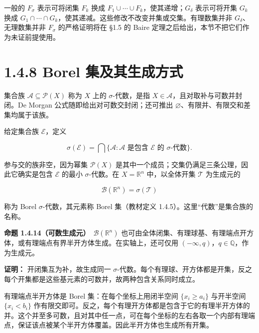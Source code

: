 \documentclass[11pt,a4paper]{article}
\begin{document}
一般的 \(F_\sigma\) 表示可将闭集 \(F_k\) 换成
\(F_1\cup\cdots\cup F_k\)，使其递增；\(G_\delta\) 表示可将开集 \(G_k\)
换成
\(G_1\cap\cdots\cap G_k\)，使其递减。这些修改不改变并集或交集。有理数集并非
\(G_\delta\)、无理数集并非 \(F_\sigma\) 的严格证明将在 §1.5 的 Baire
定理之后给出，本节不把它们作为未证前提使用。

\section[\S{}1.4.8 Borel
集及其生成方式]{1.4.8 Borel
集及其生成方式}\label{borel-ux96c6ux53caux5176ux751fux6210ux65b9ux5f0f}

集合族 \(\mathcal A\subseteq\mathcal P(X)\) 称为 \(X\) 上的
\(\sigma\)-代数，是指 \(X\in\mathcal A\)，且对取补与可数并封闭。De
Morgan 公式随即给出对可数交封闭；还可推出
\(\varnothing\)、有限并、有限交和差集均属于该族。

给定集合族 \(\mathcal E\)，定义

\begin{equation*}
\sigma(\mathcal E)=\bigcap\{\mathcal A:\mathcal A\text{ 是包含 }\mathcal E\text{ 的 }\sigma\text{-代数} \}.
\tag{1.4.15}
\end{equation*}

参与交的族非空，因为幂集 \(\mathcal P(X)\)
是其中一个成员；交集仍满足三条公理，因此它确实是包含 \(\mathcal E\)
的最小 \(\sigma\)-代数。在 \(X=\mathbb R^n\) 中，以全体开集
\(\mathcal T\) 为生成元的

\begin{equation*}
\mathcal B(\mathbb R^n)=\sigma(\mathcal T)
\tag{1.4.16}
\end{equation*}

称为 Borel \(\sigma\)-代数，其元素称 Borel 集（教材定义
1.4.5）。这里``代数''是集合族的名称。

\textbf{命题 1.4.14（可数生成元）}　\(\mathcal B(\mathbb R^n)\)
也可由全体闭集、有理球基、有理端点开方体，或有理端点有界半开方体生成。在实轴上，还可仅用
\((-\infty,q)\)，\(q\in\mathbb Q\)，作为生成元。

\textbf{证明：} 开闭集互为补，故生成同一
\(\sigma\)-代数。每个有理球、开方体都是开集，反之每个开集都是这些基元素的可数并，故两种包含关系同时成立。

有理端点半开方体是 Borel 集：在每个坐标上用闭半空间 \(\{x_i\geq a_i\}\)
与开半空间 \(\{x_i<b_i\}\)
作有限交即可。反之，每个有理开方体都是包含于它的有理半开方体的并。这个并至多可数，且对其中任一点，可在每个坐标的左右各取一个内部有理端点，保证该点被某个半开方体覆盖。因此半开方体也生成所有开集。
\end{document}

